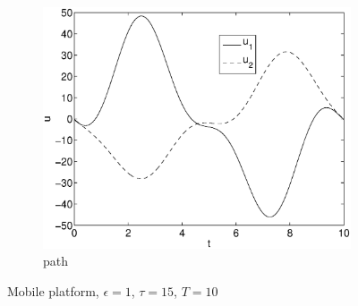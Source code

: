 \begin{figure}[h]
\begin{subfigure}[b]{\textwidth}
\centering
\includegraphics[height=0.3\textheight]{img/final_1_15_10_u.eps}
\caption{path}
\end{subfigure}
\caption{Mobile platform, $\epsilon=1$, $\tau=15$, $T=10$}
\label{fig:pl5}
\end{figure}

